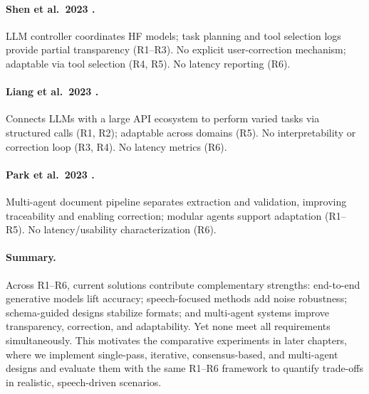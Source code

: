 \paragraph{Shen et al.\ 2023 \cite{shen2023hugginggpt}.}
LLM controller coordinates HF models; task planning and tool selection logs provide partial transparency (R1--R3). No explicit user-correction mechanism; adaptable via tool selection (R4, R5). No latency reporting (R6).

\paragraph{Liang et al.\ 2023 \cite{liang2023taskmatrix}.}
Connects LLMs with a large API ecosystem to perform varied tasks via structured calls (R1, R2); adaptable across domains (R5). No interpretability or correction loop (R3, R4). No latency metrics (R6).

\paragraph{Park et al.\ 2023 \cite{park2023generative}.}
Multi-agent document pipeline separates extraction and validation, improving traceability and enabling correction; modular agents support adaptation (R1--R5). No latency/usability characterization (R6).

\paragraph{Summary.}
Across R1--R6, current solutions contribute complementary strengths: end-to-end generative models lift accuracy; speech-focused methods add noise robustness; schema-guided designs stabilize formats; and multi-agent systems improve transparency, correction, and adaptability. Yet none meet all requirements simultaneously. This motivates the comparative experiments in later chapters, where we implement single-pass, iterative, consensus-based, and multi-agent designs and evaluate them with the same R1--R6 framework to quantify trade-offs in realistic, speech-driven scenarios.
